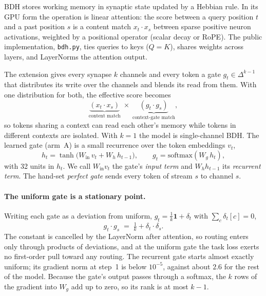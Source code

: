 \documentclass[11pt]{article}
\newcommand{\arm}[1]{\textsf{#1}}
\begin{document}
BDH \cite{bdh} stores working memory in synaptic state updated by a Hebbian rule. In its GPU form the operation is linear attention: the score between a query position $t$ and a past position $s$ is a content match $x_t \cdot x_s$ between sparse positive neuron activations, weighted by a positional operator (scalar decay or RoPE). The public implementation, \texttt{bdh.py}, ties queries to keys ($Q = K$), shares weights across layers, and LayerNorms the attention output.

The extension gives every synapse $k$ channels and every token a gate $g_t \in \Delta^{k-1}$ that distributes its write over the channels and blends its read from them. With one distribution for both, the effective score becomes
\begin{equation}
\underbrace{(x_t \cdot x_s)}_{\text{content match}}\;\times\;\underbrace{(g_t \cdot g_s)}_{\text{context-gate match}},
\label{eq:score}
\end{equation}
so tokens sharing a context can read each other's memory while tokens in different contexts are isolated. With $k = 1$ the model is single-channel BDH. The learned gate (arm~\arm{A}) is a small recurrence over the token embeddings $v_t$,
\begin{equation}
h_t = \tanh\bigl(W_{\mathrm{in}}\,v_t + W_h\,h_{t-1}\bigr), \qquad g_t = \mathrm{softmax}(W_g\,h_t),
\label{eq:gate}
\end{equation}
with 32 units in $h_t$. We call $W_{\mathrm{in}} v_t$ the gate's \emph{input term} and $W_h h_{t-1}$ its \emph{recurrent term}. The hand-set \emph{perfect gate} sends every token of stream $s$ to channel $s$.

\paragraph{The uniform gate is a stationary point.} Writing each gate as a deviation from uniform, $g_t = \tfrac{1}{k}\mathbf{1} + \delta_t$ with $\sum_c \delta_t[c] = 0$,
\begin{equation}
g_t \cdot g_s \;=\; \tfrac{1}{k} + \delta_t \cdot \delta_s .
\label{eq:product}
\end{equation}
The constant is cancelled by the LayerNorm after attention, so routing enters only through products of deviations, and at the uniform gate the task loss exerts no first-order pull toward any routing. The recurrent gate starts almost exactly uniform; its gradient norm at step~1 is below $10^{-5}$, against about $2.6$ for the rest of the model. Because the gate's output passes through a softmax, the $k$ rows of the gradient into $W_g$ add up to zero, so its rank is at most $k - 1$.
\end{document}
